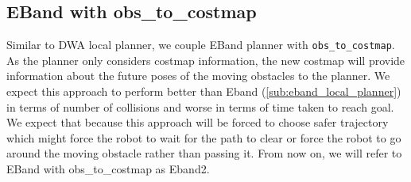 \subsection{EBand with obs\_to\_costmap}%
\label{sub:eband2_local_planner}
Similar to DWA local planner, we couple EBand planner\cite{eband} with \texttt{obs\_to\_costmap}.
As the planner only considers costmap information, the new costmap will provide information
about the future poses of the moving obstacles to the planner. We expect this approach to 
perform better than Eband (\ref{sub:eband_local_planner}) in terms of number of collisions and worse in
terms of time taken to reach goal. We expect that because this approach will be forced to 
choose safer trajectory which might force the robot to wait for the path to clear or force 
the robot to go around the moving obstacle rather than passing it.
From now on, we will refer to EBand with obs\_to\_costmap as Eband2.

